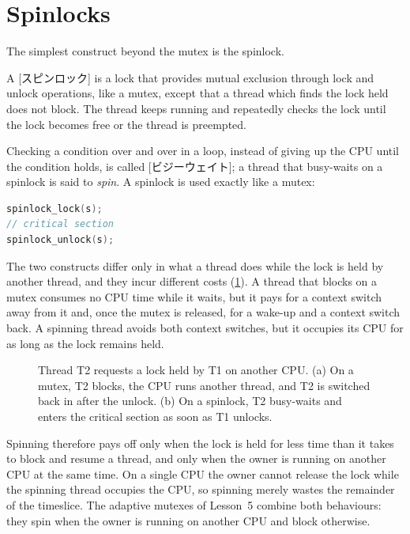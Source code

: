 \documentclass[../main.tex]{subfiles}
\begin{document}
\section{Spinlocks}
\label{sec:l10-spinlock}

The simplest construct beyond the mutex is the spinlock.

\begin{definition}[Spinlock]
  A [スピンロック] is a lock that provides mutual exclusion
  through lock and unlock operations, like a mutex, except that a thread
  which finds the lock held does not block.  The thread keeps running and
  repeatedly checks the lock until the lock becomes free or the thread is
  preempted.
\end{definition}

Checking a condition over and over in a loop, instead of giving up the CPU
until the condition holds, is called [ビジーウェイト]; a
thread that busy-waits on a spinlock is said to \emph{spin}.  A spinlock is
used exactly like a mutex:
\begin{lstlisting}[language=C, numbers=none]
spinlock_lock(s);
// critical section
spinlock_unlock(s);
\end{lstlisting}

The two constructs differ only in what a thread does while the lock is held
by another thread, and they incur different costs
(\cref{fig:l10-spin-block}).  A thread that blocks on a mutex consumes no
CPU time while it waits, but it pays for a context switch away from it and,
once the mutex is released, for a wake-up and a context switch back.  A
spinning thread avoids both context switches, but it occupies its CPU for
as long as the lock remains held.

\begin{figure}[htbp]
  \centering
  
  \caption{Thread T2 requests a lock held by T1 on another CPU.  (a) On a
    mutex, T2 blocks, the CPU runs another thread, and T2 is switched back
    in after the unlock.  (b) On a spinlock, T2 busy-waits and enters the
    critical section as soon as T1 unlocks.}
  \label{fig:l10-spin-block}
\end{figure}

Spinning therefore pays off only when the lock is held for less time than
it takes to block and resume a thread, and only when the owner is running
on another CPU at the same time.  On a single CPU the owner cannot release
the lock while the spinning thread occupies the CPU, so spinning merely
wastes the remainder of the timeslice.  The adaptive mutexes of Lesson~5
combine both behaviours: they spin when the owner is running on another
CPU and block otherwise.
\end{document}
